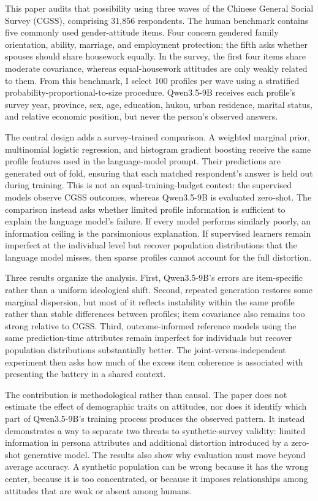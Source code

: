 \documentclass[11pt]{article}
\begin{document}
This paper audits that possibility using three waves of the Chinese General Social Survey (CGSS), comprising 31,856 respondents. The human benchmark contains five commonly used gender-attitude items. Four concern gendered family orientation, ability, marriage, and employment protection; the fifth asks whether spouses should share housework equally. In the survey, the first four items share moderate covariance, whereas equal-housework attitudes are only weakly related to them. From this benchmark, I select 100 profiles per wave using a stratified probability-proportional-to-size procedure. Qwen3.5-9B receives each profile's survey year, province, sex, age, education, hukou, urban residence, marital status, and relative economic position, but never the person's observed answers.

The central design adds a survey-trained comparison. A weighted marginal prior, multinomial logistic regression, and histogram gradient boosting receive the same profile features used in the language-model prompt. Their predictions are generated out of fold, ensuring that each matched respondent's answer is held out during training. This is not an equal-training-budget contest: the supervised models observe CGSS outcomes, whereas Qwen3.5-9B is evaluated zero-shot. The comparison instead asks whether limited profile information is sufficient to explain the language model's failure. If every model performs similarly poorly, an information ceiling is the parsimonious explanation. If supervised learners remain imperfect at the individual level but recover population distributions that the language model misses, then sparse profiles cannot account for the full distortion.

Three results organize the analysis. First, Qwen3.5-9B's errors are item-specific rather than a uniform ideological shift. Second, repeated generation restores some marginal dispersion, but most of it reflects instability within the same profile rather than stable differences between profiles; item covariance also remains too strong relative to CGSS. Third, outcome-informed reference models using the same prediction-time attributes remain imperfect for individuals but recover population distributions substantially better. The joint-versus-independent experiment then asks how much of the excess item coherence is associated with presenting the battery in a shared context.

The contribution is methodological rather than causal. The paper does not estimate the effect of demographic traits on attitudes, nor does it identify which part of Qwen3.5-9B's training process produces the observed pattern. It instead demonstrates a way to separate two threats to synthetic-survey validity: limited information in persona attributes and additional distortion introduced by a zero-shot generative model. The results also show why evaluation must move beyond average accuracy. A synthetic population can be wrong because it has the wrong center, because it is too concentrated, or because it imposes relationships among attitudes that are weak or absent among humans.
\end{document}
